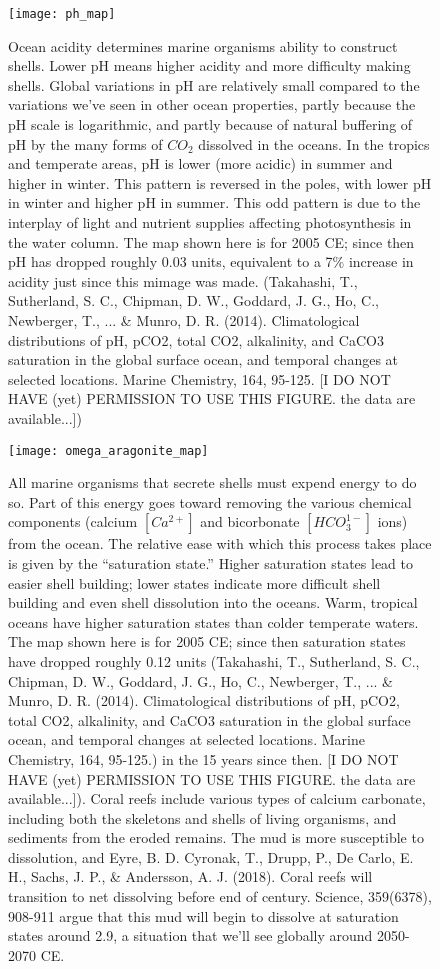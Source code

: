 \documentclass[amstex,12pt]{book}
\begin{document}
{\newpage
\begin{figure}[p]
\centering
  \texttt{[image: ph\_map]}%
\caption{Ocean acidity determines marine organisms ability to construct shells. Lower pH means higher acidity and more difficulty making shells. Global variations in pH are relatively small compared to the variations we've seen in other ocean properties, partly because the pH scale is logarithmic, and partly because of natural buffering of pH by the many forms of $CO_2$ dissolved in the oceans. In the tropics and temperate areas, pH is lower (more acidic) in summer and higher in winter. This pattern is reversed in the poles, with lower pH in winter and higher pH in summer. This odd pattern is due to the interplay of light and nutrient supplies affecting photosynthesis in the water column. The map shown here is for 2005 CE; since then pH has dropped roughly 0.03 units, equivalent to a 7\% increase in acidity just since this mimage was made. (Takahashi, T., Sutherland, S. C., Chipman, D. W., Goddard, J. G., Ho, C., Newberger, T., ... \& Munro, D. R. (2014). Climatological distributions of pH, pCO2, total CO2, alkalinity, and CaCO3 saturation in the global surface ocean, and temporal changes at selected locations. Marine Chemistry, 164, 95-125. [I DO NOT HAVE (yet) PERMISSION TO USE THIS FIGURE. the data are available...])  }
\label{fig:ph_map}
\end{figure}


\begin{figure}[p]
\centering
  \texttt{[image: omega\_aragonite\_map]}%
\caption{All marine organisms that secrete shells must expend energy to do so. Part of this energy goes toward removing the various chemical components (calcium  $[Ca^{2+}]$ and bicorbonate $[HCO_3^{1-}]$ ions) from the ocean. The relative ease with which this process takes place is given by the ``saturation state.'' Higher saturation states lead to easier shell building; lower states indicate more difficult shell building and even shell dissolution into the oceans. Warm, tropical oceans have higher saturation states than colder temperate waters. The map shown here is for 2005 CE; since then saturation states have dropped roughly 0.12 units (Takahashi, T., Sutherland, S. C., Chipman, D. W., Goddard, J. G., Ho, C., Newberger, T., ... \& Munro, D. R. (2014). Climatological distributions of pH, pCO2, total CO2, alkalinity, and CaCO3 saturation in the global surface ocean, and temporal changes at selected locations. Marine Chemistry, 164, 95-125.) in the 15 years since then. [I DO NOT HAVE (yet) PERMISSION TO USE THIS FIGURE. the data are available...]). Coral reefs include various types of calcium carbonate, including both the skeletons and shells of living organisms, and sediments from the eroded remains. The mud is more susceptible to dissolution, and Eyre, B. D. Cyronak, T., Drupp, P., De Carlo, E. H., Sachs, J. P., \& Andersson, A. J. (2018). Coral reefs will transition to net dissolving before end of century. Science, 359(6378), 908-911 argue that this mud will begin to dissolve at saturation states around 2.9, a situation that we'll see globally around 2050-2070 CE.  }
\label{fig:arag_map}
\end{figure}



}
\end{document}
